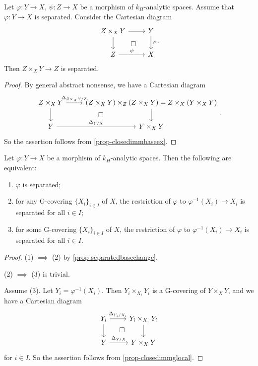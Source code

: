 \begin{proposition}\label{prop-separatedbasechange}
    Let $\varphi:Y\rightarrow X$, $\psi:Z\rightarrow X$ be a morphism of $k_H$-analytic spaces. Assume that $\varphi:Y\rightarrow X$ is separated. Consider the Cartesian diagram
    \[
        \begin{tikzcd}
            Z\times_X Y \arrow[r] \arrow[d] \arrow[rd, "\square", phantom] & Y \arrow[d,"\varphi"] \\
            Z \arrow[r,"\psi"]                                                    & X          
        \end{tikzcd}.  
    \]
    Then $Z\times_X Y\rightarrow Z$ is separated.
\end{proposition}
\begin{proof}
    By general abstract nonsense, we have a Cartesian diagram
    \[
        \begin{tikzcd}
            Z\times_X Y \arrow[r,"\Delta_{Z\times_X Y/Z}"] \arrow[d] \arrow[rd, "\square", phantom] & (Z\times_X Y)\times_Z (Z\times_X Y)=Z\times_X (Y\times_X Y) \arrow[d] \\
            Y \arrow[r,"\Delta_{Y/X}"]                                                    & Y\times_X Y          
        \end{tikzcd}.  
    \]
    So the assertion follows from \cref{prop-closedimmbaseex}.
\end{proof}

\begin{proposition}
    Let $\varphi:Y\rightarrow X$ be a morphism of $k_H$-analytic spaces. Then the following are equivalent:
    \begin{enumerate}
        \item $\varphi$ is separated;
        \item for any G-covering $\{X_i\}_{i\in I}$ of $X$, the restriction of $\varphi$ to $\varphi^{-1}(X_i)\rightarrow X_i$ is separated for all $i\in I$;
        \item for some G-covering $\{X_i\}_{i\in I}$ of $X$, the restriction of $\varphi$ to $\varphi^{-1}(X_i)\rightarrow X_i$ is separated for all $i\in I$.
    \end{enumerate}
\end{proposition}
\begin{proof}
    (1) $\implies$ (2) by \cref{prop-separatedbasechange}.

    (2) $\implies$ (3) is trivial.

    Assume (3). Let $Y_i=\varphi^{-1}(X_i)$. Then $Y_i\times_{X_i} Y_i$ is a G-covering of $Y\times_X Y$, and we have a Cartesian diagram
    \[
        \begin{tikzcd}
            Y_i \arrow[r,"\Delta_{Y_i/X_i}"] \arrow[d] \arrow[rd, "\square", phantom] & Y_i\times_{X_i}Y_i \arrow[d] \\
            Y \arrow[r,"\Delta_{Y/X}"]                                                    & Y\times_X Y          
        \end{tikzcd}  
    \]
    for $i\in I$. So the assertion follows from \cref{prop-closedimmglocal}.
\end{proof}

